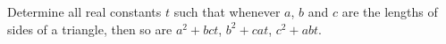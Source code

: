 Determine all real constants $t$ such that whenever $a$, $b$ and $c$ are the lengths of sides of a triangle, then so are $a^2+bct$, $b^2+cat$, $c^2+abt$.